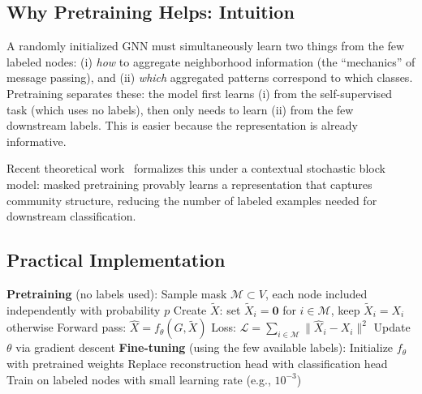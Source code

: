 \begin{notechapter}
\subsection{Why Pretraining Helps: Intuition}

A randomly initialized GNN must simultaneously learn two things from the few
labeled nodes: (i) \emph{how} to aggregate neighborhood information
(the ``mechanics'' of message passing), and (ii) \emph{which} aggregated
patterns correspond to which classes. Pretraining separates these: the model
first learns (i) from the self-supervised task (which uses no labels), then
only needs to learn (ii) from the few downstream labels. This is easier
because the representation is already informative.

Recent theoretical work~\cite{semi-supervised-graphs:baranwal2023} formalizes this under a contextual
stochastic block model: masked pretraining provably learns a representation
that captures community structure, reducing the number of labeled examples
needed for downstream classification.

\subsection{Practical Implementation}

\begin{algorithm}[H]
\caption{Masked Feature Pretraining + Fine-tuning}
\label{semi-supervised-graphs:alg:masked_pretrain}
\begin{algorithmic}[1]
\State \textbf{Pretraining} (no labels used):
    \State Sample mask $\mathcal{M} \subset V$, each node included
           independently with probability $p$
    \State Create $\tilde{X}$: set $\tilde{X}_i = \mathbf{0}$ for
           $i \in \mathcal{M}$, keep $\tilde{X}_i = X_i$ otherwise
    \State Forward pass: $\hat{X} = f_\theta(G, \tilde{X})$
    \State Loss: $\mathcal{L} = \sum_{i \in \mathcal{M}}
           \|\hat{X}_i - X_i\|^2$
    \State Update $\theta$ via gradient descent
\EndFor
\State
\State \textbf{Fine-tuning} (using the few available labels):
\State Initialize $f_\theta$ with pretrained weights
\State Replace reconstruction head with classification head
\State Train on labeled nodes with small learning rate (e.g., $10^{-3}$)
\end{algorithmic}
\end{algorithm}


\end{notechapter}
